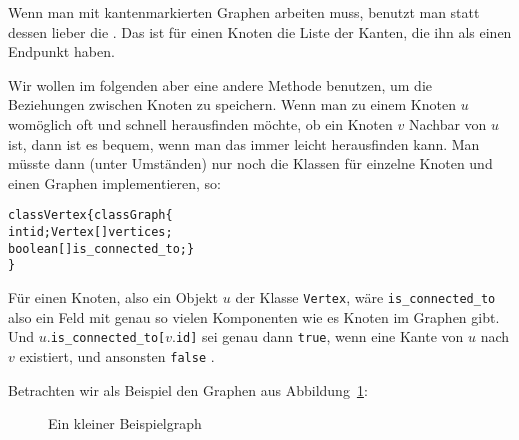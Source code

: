 Wenn man mit kantenmarkierten Graphen arbeiten muss, benutzt man statt
dessen lieber die
. Das ist
für einen Knoten die Liste der Kanten, die ihn als einen Endpunkt
haben.

Wir wollen im folgenden aber eine andere Methode benutzen, um die
Beziehungen zwischen Knoten zu speichern. Wenn man zu einem Knoten $u$
womöglich oft und schnell herausfinden möchte, ob ein Knoten $v$
Nachbar von $u$ ist, dann ist es bequem, wenn man das immer leicht
herausfinden kann. Man müsste dann (unter Umständen) nur noch die
Klassen für einzelne Knoten und einen Graphen implementieren, \zB so:
% 
\begin{alltt}
  class Vertex \{                              class Graph \{            
     int id;                                      Vertex[] vertices;     
     boolean[] is_connected_to;               \}                         
  \}
\end{alltt}
% 
Für einen Knoten, also ein Objekt $u$ der Klasse \texttt{Vertex}, wäre
\verb|is_connected_to| also ein Feld mit genau so vielen Komponenten
wie es Knoten im Graphen gibt. Und
$u$.\verb|is_connected_to[|$v$.\verb|id|\verb|]| sei genau dann
\texttt{true}, wenn eine Kante von $u$ nach $v$ existiert, und
ansonsten \texttt{false} .

Betrachten wir als Beispiel den Graphen aus Abbildung~\ref{abb:adj-mat}:
\begin{figure}[ht]
  \centering
  \caption{Ein kleiner Beispielgraph}
  \label{abb:adj-mat}
\end{figure}

